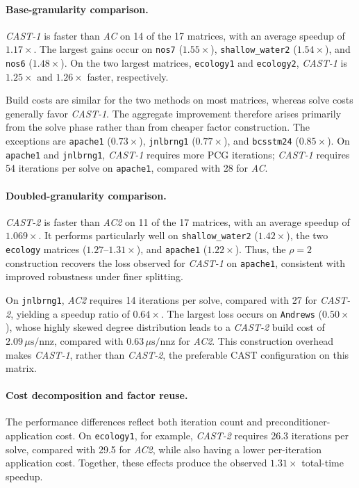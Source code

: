 \documentclass{article}
\newcommand{\CASTone}{\textit{CAST-1}\xspace}
\newcommand{\CASTtwo}{\textit{CAST-2}\xspace}
\newcommand{\AC}{\textit{AC}\xspace}
\newcommand{\ACtwo}{\textit{AC2}\xspace}
\newcommand{\1}{\mathbbm{1}}
\theoremstyle{plain}
\begin{document}
\paragraph{Base-granularity comparison.}
\CASTone is faster than \AC on 14 of the 17 matrices, with an average
 speedup of $1.17\times$. The largest gains occur on
\texttt{nos7} ($1.55\times$), \texttt{shallow\_water2}
($1.54\times$), and \texttt{nos6} ($1.48\times$). On the two largest
matrices, \texttt{ecology1} and \texttt{ecology2}, \CASTone is
$1.25\times$ and $1.26\times$ faster, respectively.

Build costs are similar for the two methods on most matrices, whereas
solve costs generally favor \CASTone. The aggregate improvement
therefore arises primarily from the solve phase rather than from
cheaper factor construction. The exceptions are \texttt{apache1}
($0.73\times$), \texttt{jnlbrng1} ($0.77\times$), and
\texttt{bcsstm24} ($0.85\times$). On \texttt{apache1} and
\texttt{jnlbrng1},  \CASTone requires more PCG
iterations; \CASTone requires 54 iterations per solve on
\texttt{apache1}, compared with 28 for \AC.

\paragraph{Doubled-granularity comparison.}
\CASTtwo is faster than \ACtwo on 11 of the 17 matrices, with an average speedup of $1.069\times$. It performs particularly
well on \texttt{shallow\_water2} ($1.42\times$), the two
\texttt{ecology} matrices ($1.27$--$1.31\times$), and
\texttt{apache1} ($1.22\times$). Thus, the $\rho=2$ construction
recovers the loss observed for \CASTone on \texttt{apache1},
consistent with improved robustness under finer splitting.

On \texttt{jnlbrng1}, \ACtwo requires 14 iterations per solve,
compared with 27 for \CASTtwo, yielding a speedup ratio of
$0.64\times$. The largest loss occurs on \texttt{Andrews}
($0.50\times$), whose highly skewed degree distribution leads to a
\CASTtwo build cost of $2.09\,\mu\mathrm{s}/\mathrm{nnz}$, compared
with $0.63\,\mu\mathrm{s}/\mathrm{nnz}$ for \ACtwo. This
construction overhead makes \CASTone, rather than \CASTtwo, the
preferable CAST configuration on this matrix.

\paragraph{Cost decomposition and factor reuse.}
The performance differences reflect both iteration count and
preconditioner-application cost. On \texttt{ecology1}, for example,
\CASTtwo requires 26.3 iterations per solve, compared with 29.5 for
\ACtwo, while also having a lower per-iteration application cost.
Together, these effects produce the observed $1.31\times$
total-time speedup.
\end{document}
